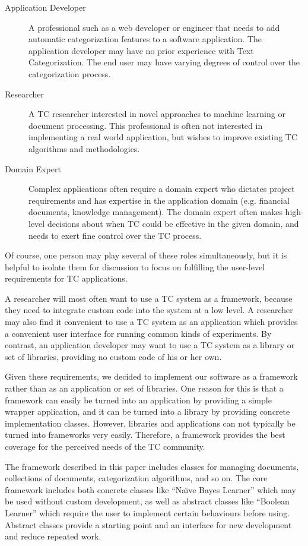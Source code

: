 \documentclass[a4paper,twocolumn]{article}
\begin{document}
\begin{description}
\item[Application Developer] A professional such as a web developer or
engineer that needs to add automatic categorization features to a
software application. The application developer may have no prior
experience with Text Categorization.  The end user may have varying
degrees of control over the categorization process.

\item[Researcher] A TC researcher interested in novel approaches to
machine learning or document processing.  This professional is often
not interested in implementing a real world application, but wishes to
improve existing TC algorithms and methodologies.

\item[Domain Expert] Complex applications often require a domain
expert who dictates project requirements and has expertise in the
application domain (e.g. financial documents, knowledge management).
The domain expert often makes high-level decisions about when TC could
be effective in the given domain, and needs to exert fine control over
the TC process.
\end{description}

Of course, one person may play several of these roles simultaneously,
but it is helpful to isolate them for discussion to focus on
fulfilling the user-level requirements for TC applications.

A researcher will most often want to use a TC system as a framework,
because they need to integrate custom code into the system at a low
level.  A researcher may also find it convenient to use a TC system as
an application which provides a convenient user interface for running
common kinds of experiments.  By contrast, an application developer
may want to use a TC system as a library or set of libraries,
providing no custom code of his or her own.

Given these requirements, we decided to implement our software as a framework rather than as an application or set of libraries.  One reason for this is that a framework can easily be turned into an application by providing a simple wrapper application, and it can be turned into a library by providing concrete implementation classes.  However, libraries and applications can not typically be turned into frameworks very easily.  Therefore, a framework provides the best coverage for the perceived needs of the TC community.

The framework described in this paper includes classes for managing documents, collections of documents, categorization algorithms, and so on.  The core framework includes both concrete classes like ``Na\"\i ve Bayes Learner'' which may be used without custom development, as well as abstract classes  like ``Boolean Learner'' which require the user to implement certain behaviours before using.  Abstract classes provide a starting point and an interface for new development and reduce repeated work.
\end{document}
